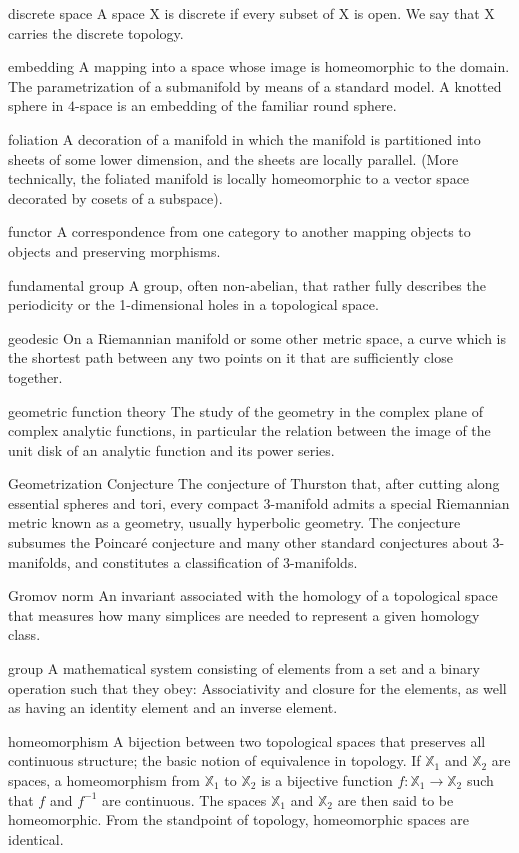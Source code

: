 \begin{description}
\begin{tiny}
\item[discrete space] A space X is discrete if every subset of X is open. We say that X carries the discrete topology.
\item[embedding] A mapping into a space whose image is homeomorphic to the domain. The parametrization of a submanifold by means of a standard model. A knotted sphere in $4$-space is an embedding of the familiar round sphere.
\item[foliation] A decoration of a manifold in which the manifold is partitioned into sheets of some lower dimension, and the sheets are locally parallel. (More technically, the foliated manifold is locally homeomorphic to a vector space decorated by cosets of a subspace).
\item[functor] A correspondence from one category to another mapping objects to objects and preserving morphisms.
\item[fundamental group] A group, often non-abelian, that rather fully describes the periodicity or the 1-dimensional holes in a topological space.
\item[geodesic] On a Riemannian manifold or some other metric space, a curve which is the shortest path between any two points on it that are sufficiently close together.
\item[geometric function theory] The study of the geometry in the complex plane of complex analytic functions, in particular the relation between the image of the unit disk of an analytic function and its power series.
\item[Geometrization Conjecture] The conjecture of Thurston that, after cutting along essential spheres and tori, every compact 3-manifold admits a special Riemannian metric known as a geometry, usually hyperbolic geometry. The conjecture subsumes the Poincaré conjecture and many other standard conjectures about 3-manifolds, and constitutes a classification of 3-manifolds.
\item[Gromov norm] An invariant associated with the homology of a topological space that measures how many simplices are needed to represent a given homology class.
\item[group] A mathematical system consisting of elements from a set and a binary operation such that they obey: Associativity and closure for the elements, as well as having an identity element and an inverse element.
\item[homeomorphism] A bijection between two topological spaces that preserves all continuous structure; the basic notion of equivalence in topology. If $\mathbb{X}_{1}$ and $\mathbb{X}_{2}$ are spaces, a homeomorphism from $\mathbb{X}_{1}$ to $\mathbb{X}_{2}$ is a bijective function $f : \mathbb{X}_{1} \rightarrow \mathbb{X}_{2}$ such that $f$ and $f^{-1}$ are continuous. The spaces $\mathbb{X}_{1}$ and $\mathbb{X}_{2}$ are then said to be homeomorphic. From the standpoint of topology, homeomorphic spaces are identical.

\end{tiny}
\end{description}

